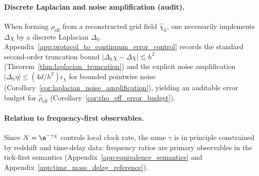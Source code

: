 \paragraph{Discrete Laplacian and noise amplification (audit).}
\AuditTag When forming $\rho_{\mathrm{eff}}$ from a reconstructed grid field $\widehat\chi_h$, one necessarily implements $\Delta\chi$ by a discrete Laplacian $\Delta_h$.
Appendix~\ref{app:protocol_to_continuum_error_control} records the standard second-order truncation bound $|\Delta_h\chi-\Delta\chi|\lesssim h^2$ (Theorem~\ref{thm:laplacian_truncation}) and the explicit noise amplification $|\Delta_h\eta|\le (4d/h^2)\epsilon_\chi$ for bounded pointwise noise (Corollary~\ref{cor:laplacian_noise_amplification}), yielding an auditable error budget for $\widehat\rho_{\mathrm{eff}}$ (Corollary~\ref{cor:rho_eff_error_budget}).

\paragraph{Relation to frequency-first observables.}
\InterfaceTag Since $N=\e^{-\gamma\chi}$ controls local clock rate, the same $\gamma$ is in principle constrained by redshift and time-delay data:
frequency ratios are primary observables in the tick-first semantics (Appendix~\ref{app:equivalence_semantics} and Appendix~\ref{app:time_mass_delay_reference}).

